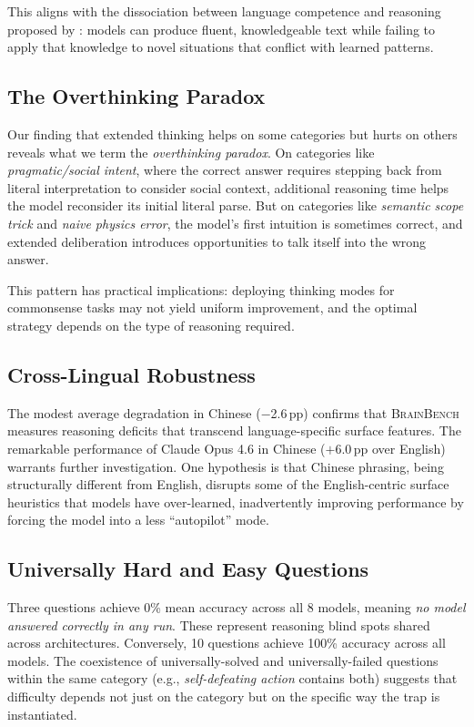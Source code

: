 \documentclass[11pt]{article}
\newcommand{\bench}{\textsc{BrainBench}}
\newcommand{\pp}{\,pp}
\begin{document}
This aligns with the dissociation between language competence and reasoning proposed by \citet{mahowald2024dissociating}: models can produce fluent, knowledgeable text while failing to apply that knowledge to novel situations that conflict with learned patterns.

\subsection{The Overthinking Paradox}

Our finding that extended thinking helps on some categories but hurts on others reveals what we term the \emph{overthinking paradox}. On categories like \emph{pragmatic/social intent}, where the correct answer requires stepping back from literal interpretation to consider social context, additional reasoning time helps the model reconsider its initial literal parse. But on categories like \emph{semantic scope trick} and \emph{naive physics error}, the model's first intuition is sometimes correct, and extended deliberation introduces opportunities to talk itself into the wrong answer.

This pattern has practical implications: deploying thinking modes for commonsense tasks may not yield uniform improvement, and the optimal strategy depends on the type of reasoning required.

\subsection{Cross-Lingual Robustness}

The modest average degradation in Chinese ($-$2.6\pp{}) confirms that \bench{} measures reasoning deficits that transcend language-specific surface features. The remarkable performance of Claude Opus 4.6 in Chinese ($+$6.0\pp{} over English) warrants further investigation. One hypothesis is that Chinese phrasing, being structurally different from English, disrupts some of the English-centric surface heuristics that models have over-learned, inadvertently improving performance by forcing the model into a less ``autopilot'' mode.

\subsection{Universally Hard and Easy Questions}

Three questions achieve 0\% mean accuracy across all 8 models, meaning \emph{no model answered correctly in any run}. These represent reasoning blind spots shared across architectures. Conversely, 10 questions achieve 100\% accuracy across all models. The coexistence of universally-solved and universally-failed questions within the same category (e.g., \emph{self-defeating action} contains both) suggests that difficulty depends not just on the category but on the specific way the trap is instantiated.
\end{document}
